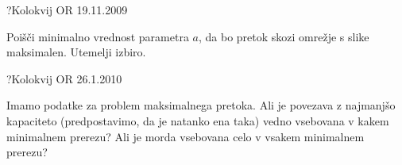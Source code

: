 
\begin{naloga}{?}{Kolokvij OR 19.11.2009}
\begin{vprasanje}[minmaxpretok]
Poišči minimalno vrednost parametra $a$,
da bo pretok skozi omrežje s slike~\fig{} maksimalen.
Utemelji izbiro.

\begin{slika}
\pgfslika
{}
\end{slika}
\end{vprasanje}
\begin{odgovor}
\end{odgovor}
\end{naloga}


\begin{naloga}{?}{Kolokvij OR 26.1.2010}
\begin{vprasanje}
Imamo podatke za problem maksimalnega pretoka.
Ali je povezava z najmanjšo kapaciteto
(predpostavimo, da je natanko ena taka)
vedno vsebovana v kakem minimalnem prerezu?
Ali je morda vsebovana celo v vsakem minimalnem prerezu?
\end{vprasanje}
\begin{odgovor}
\end{odgovor}
\end{naloga}


